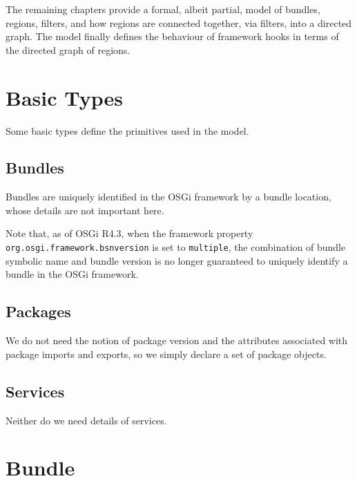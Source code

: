 \documentclass[a4paper,9pt,twoside]{article}
\begin{document}
The remaining chapters provide a formal, albeit partial, model of bundles, regions, filters, and how
regions are connected together, via filters, into a directed graph.
The model finally defines the behaviour of framework hooks in terms of the directed graph of regions.

\clearpage
\section{Basic Types}
\label{cha:basics}

Some basic types define the primitives used in the model.

\subsection*{Bundles}

Bundles are uniquely identified in the OSGi framework by a bundle location, whose details are not
important here.
\begin{zed}
  [BLoc]
\end{zed}
Note that, as of OSGi R4.3, when the framework property \texttt{org.osgi.framework.bsnversion}
is set to \texttt{multiple}, the combination of bundle symbolic name and bundle version is no
longer guaranteed to uniquely identify a bundle in the OSGi framework.

\subsection*{Packages}

We do not need the notion of package version and the attributes associated with package imports
and exports, so we simply declare a set of package objects.
\begin{zed}
  [Package]
\end{zed}

\subsection*{Services}

Neither do we need details of services.
\begin{zed}
  [Service]
\end{zed}

\clearpage
\section{Bundle}
\label{cha:bundle}
\end{document}
